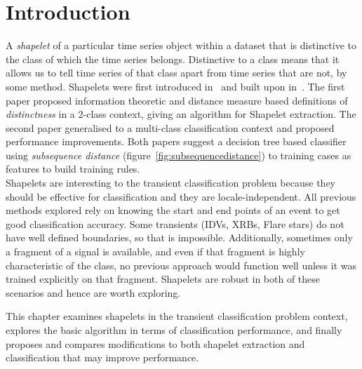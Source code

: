 \section{Introduction}
A \emph{shapelet} of a particular time series object within a dataset that is distinctive to the class of which the time series belongs. Distinctive to a class means that it allows us to tell time series of that class apart from time series that are not, by some method. Shapelets were first introduced in~\citet{ye2009time} and built upon in~\citet{mueen2011logical}. The first paper proposed information theoretic and distance measure based definitions of \emph{distinctness} in a 2-class context, giving an algorithm for Shapelet extraction. The second paper generalised to a multi-class classification context and proposed performance improvements. Both papers suggest a decision tree based classifier using \emph{subsequence distance} (figure~\ref{fig:subsequencedistance}) to training cases as features to build training rules. \\

Shapelets are interesting to the transient classification problem because they should be effective for classification and they are locale-independent. All previous methods explored rely on knowing the start and end points of an event to get good classification accuracy. Some transients (IDVs, XRBs, Flare stars) do not have well defined boundaries, so that is impossible. Additionally, sometimes only a fragment of a signal is available, and even if that fragment is highly characteristic of the class, no previous approach would function well unless it was trained explicitly on that fragment. Shapelets are robust in both of these scenarios and hence are worth exploring.

This chapter examines shapelets in the transient classification problem context, explores the basic algorithm in terms of classification performance, and finally proposes and compares modifications to both shapelet extraction and classification that may improve performance.


